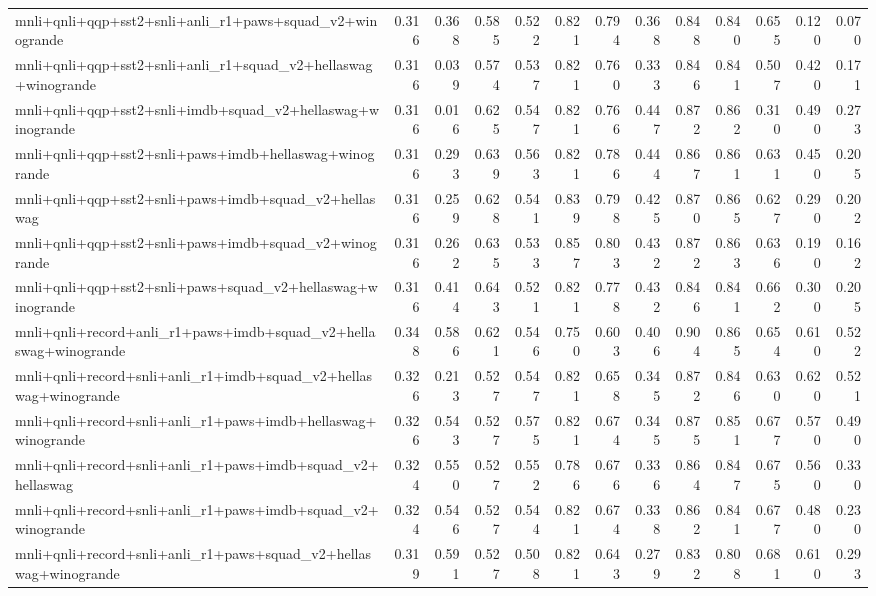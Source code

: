 \begin{table}[t]
\begin{tabular}{lrrrrrrrrrrrr}
    mnli+qnli+qqp+sst2+snli+anli\_r1+paws+squad\_v2+winogrande & 0.316 & 0.368 & 0.585 & 0.522 & 0.821 & 0.794 & 0.368 & 0.848 & 0.840 & 0.655 & 0.120 & 0.070 \\
    mnli+qnli+qqp+sst2+snli+anli\_r1+squad\_v2+hellaswag+winogrande & 0.316 & 0.039 & 0.574 & 0.537 & 0.821 & 0.760 & 0.333 & 0.846 & 0.841 & 0.507 & 0.420 & 0.171 \\
    mnli+qnli+qqp+sst2+snli+imdb+squad\_v2+hellaswag+winogrande & 0.316 & 0.016 & 0.625 & 0.547 & 0.821 & 0.766 & 0.447 & 0.872 & 0.862 & 0.310 & 0.490 & 0.273 \\
    mnli+qnli+qqp+sst2+snli+paws+imdb+hellaswag+winogrande & 0.316 & 0.293 & 0.639 & 0.563 & 0.821 & 0.786 & 0.444 & 0.867 & 0.861 & 0.631 & 0.450 & 0.205 \\
    mnli+qnli+qqp+sst2+snli+paws+imdb+squad\_v2+hellaswag & 0.316 & 0.259 & 0.628 & 0.541 & 0.839 & 0.798 & 0.425 & 0.870 & 0.865 & 0.627 & 0.290 & 0.202 \\
    mnli+qnli+qqp+sst2+snli+paws+imdb+squad\_v2+winogrande & 0.316 & 0.262 & 0.635 & 0.533 & 0.857 & 0.803 & 0.432 & 0.872 & 0.863 & 0.636 & 0.190 & 0.162 \\
    mnli+qnli+qqp+sst2+snli+paws+squad\_v2+hellaswag+winogrande & 0.316 & 0.414 & 0.643 & 0.521 & 0.821 & 0.778 & 0.432 & 0.846 & 0.841 & 0.662 & 0.300 & 0.205 \\
    mnli+qnli+record+anli\_r1+paws+imdb+squad\_v2+hellaswag+winogrande & 0.348 & 0.586 & 0.621 & 0.546 & 0.750 & 0.603 & 0.406 & 0.904 & 0.865 & 0.654 & 0.610 & 0.522 \\
    mnli+qnli+record+snli+anli\_r1+imdb+squad\_v2+hellaswag+winogrande & 0.326 & 0.213 & 0.527 & 0.547 & 0.821 & 0.658 & 0.345 & 0.872 & 0.846 & 0.630 & 0.620 & 0.521 \\
    mnli+qnli+record+snli+anli\_r1+paws+imdb+hellaswag+winogrande & 0.326 & 0.543 & 0.527 & 0.575 & 0.821 & 0.674 & 0.345 & 0.875 & 0.851 & 0.677 & 0.570 & 0.490 \\
    mnli+qnli+record+snli+anli\_r1+paws+imdb+squad\_v2+hellaswag & 0.324 & 0.550 & 0.527 & 0.552 & 0.786 & 0.676 & 0.336 & 0.864 & 0.847 & 0.675 & 0.560 & 0.330 \\
    mnli+qnli+record+snli+anli\_r1+paws+imdb+squad\_v2+winogrande & 0.324 & 0.546 & 0.527 & 0.544 & 0.821 & 0.674 & 0.338 & 0.862 & 0.841 & 0.677 & 0.480 & 0.230 \\
    mnli+qnli+record+snli+anli\_r1+paws+squad\_v2+hellaswag+winogrande & 0.319 & 0.591 & 0.527 & 0.508 & 0.821 & 0.643 & 0.279 & 0.832 & 0.808 & 0.681 & 0.610 & 0.293 \\

\end{tabular}
\end{table}
